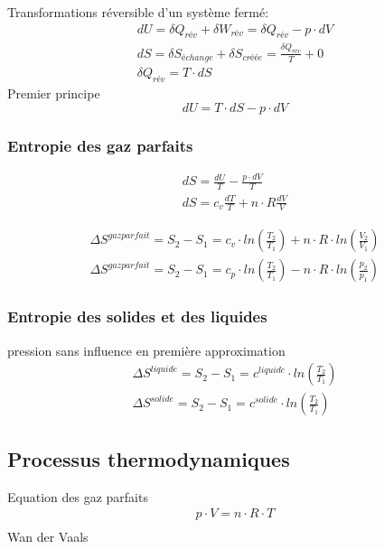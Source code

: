 	Transformations réversible d'un système fermé: 
	\begin{eqnarray}
	dU = \delta Q_{rév} + \delta W_{rév} = \delta Q_{rév} - p \cdot d V\\
	dS = \delta S_{échange} + \delta S_{créée} = \frac{\delta Q_{rév}}{T} + 0\\
	\delta Q_{rév} = T \cdot dS
	\end{eqnarray}
	Premier principe
	\begin{equation}
	dU = T \cdot dS - p \cdot dV
	\end{equation}
	\subsubsection{Entropie  des gaz parfaits}
	\begin{eqnarray}
	dS = \frac{dU}{T} - \frac{p \cdot dV}{T}\\
	dS = c_v \frac{dT}{T} + n \cdot R \frac{dV}{V}
	\end{eqnarray}
	
	\begin{eqnarray}
	\Delta S^{gaz parfait}=S_2 - S_1 = c_v \cdot ln(\frac{T_2}{T_1})+ n \cdot R \cdot ln(\frac{V_2}{V_1})\\
	\Delta S^{gaz parfait}=S_2 - S_1 = c_p \cdot ln(\frac{T_2}{T_1})- n \cdot R \cdot ln(\frac{p_2}{p_1})
	\end{eqnarray}
	\subsubsection{Entropie des solides et des liquides}
	pression sans influence en première approximation
	\begin{eqnarray}
	\Delta S^{liquide}=S_2 - S_1 = c^{liquide} \cdot ln(\frac{T_2}{T_1})\\
	\Delta S^{solide}=S_2 - S_1 = c^{solide} \cdot ln(\frac{T_2}{T_1})
	\end{eqnarray}
	\subsection{Processus thermodynamiques}
	Equation des gaz parfaits 
	\begin{eqnarray}
	p \cdot V = n \cdot R \cdot T\\
	\end{eqnarray}
	Wan der Vaals
